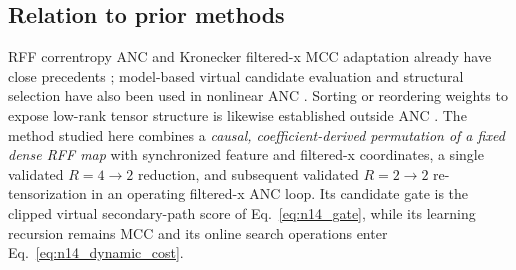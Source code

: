 \subsection{Relation to prior methods}
RFF correntropy ANC and Kronecker filtered-x MCC adaptation already have
close precedents \cite{ref11,n14_nkp_fxnsaf_mcc}; model-based virtual
candidate evaluation and structural selection have also been used in
nonlinear ANC \cite{n14_spiriti}.  Sorting or reordering weights to expose
low-rank tensor structure is likewise established outside ANC
\cite{n14_einsort,n14_neukron}.  The method studied here combines a
\emph{causal, coefficient-derived permutation of a fixed dense RFF map}
with synchronized feature and filtered-x coordinates, a single validated
$R=4\!\to\!2$ reduction, and subsequent validated $R=2\!\to\!2$
re-tensorization in an operating filtered-x ANC loop.  Its candidate
gate is the clipped virtual secondary-path score of
Eq.~\eqref{eq:n14_gate}, while its learning recursion remains MCC and
its online search operations enter Eq.~\eqref{eq:n14_dynamic_cost}.
